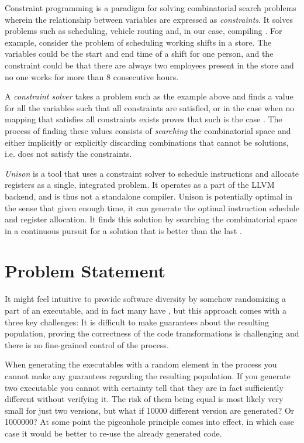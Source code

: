 Constraint programming is a paradigm for solving combinatorial search problems wherein
the relationship between variables are expressed as \textit{constraints}. It solves problems
such as scheduling, vehicle routing and, in our case, compiling
 \cite{handbook-constraint-programming, unison-docs}. For example, consider the problem
of scheduling working shifts in a store. The variables could be the start and end time
of a shift for one person, and the constraint could be that there are always two employees
present in the store and no one works for more than 8 consecutive hours.

A \textit{constraint solver} takes a problem such as the example above and finds a value
for all the variables such that all constraints are satisfied, or in the case when no
mapping that satisfies all constraints exists proves that such is the case
 \cite{handbook-constraint-programming}. The process of finding these values consists of
\textit{searching} the combinatorial space and either implicitly or explicitly discarding
combinations that cannot be solutions, i.e. does not satisfy the constraints.

\textit{Unison} is a tool that uses a constraint solver to schedule instructions and allocate
registers as a single, integrated problem. It operates as a part of the LLVM backend, and
is thus not a standalone compiler. Unison is potentially optimal in the sense that given
enough time, it can generate the optimal instruction schedule and register allocation.
It finds this solution by searching the combinatorial space in a continuous pursuit for a
solution that is better than the last \cite{unison-docs}.

\section{Problem Statement}

It might feel intuitive to provide software diversity by somehow randomizing a part of an
executable, and in fact many have \cite{survey,librando,binary-stirring}, but this
approach comes with a three key challenges: It is difficult to make guarantees about the
resulting population, proving the correctness of the code transformations is challenging
and there is no fine-grained control of the process.

When generating the executables with a random element in the process you cannot make any
guarantees regarding the resulting population. If you generate two executable you cannot
with certainty tell that they are in fact sufficiently different without verifying it. The
risk of them being equal is most likely very small for just two versions, but what if
10000 different version are generated? Or 1000000? At some point the pigeonhole principle
comes into effect, in which case case it would be better to re-use the already generated
code.

